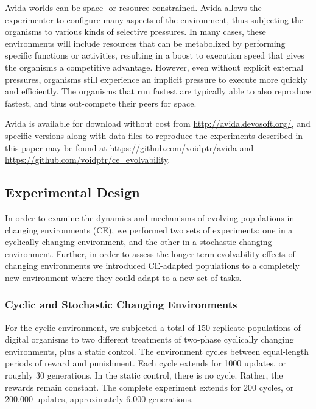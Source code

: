 \documentclass[10pt,letterpaper]{article}
\begin{document}
Avida worlds can be space- or resource-constrained. Avida allows the experimenter to configure many aspects of the environment, thus subjecting the organisms to various kinds of selective pressures.  In many cases, these environments will include resources that can be metabolized by performing specific functions or activities, resulting in a boost to execution speed that gives the organisms a competitive advantage. However, even without explicit external pressures, organisms still experience an implicit pressure to execute more quickly and efficiently. The organisms that run fastest are typically able to also reproduce fastest, and thus out-compete their peers for space.

Avida is available for download without cost from \url{http://avida.devosoft.org/}, and specific versions along with data-files to reproduce the experiments described in this paper may be found at \url{https://github.com/voidptr/avida} and \url{https://github.com/voidptr/ce_evolvability}.

\subsection*{Experimental Design}

In order to examine the dynamics and mechanisms of evolving populations in changing environments (CE), we performed two sets of experiments: one in a cyclically changing environment, and the other in a stochastic changing environment. Further, in order to assess the longer-term evolvability effects of changing environments we introduced CE-adapted populations to a completely new environment where they could adapt to a new set of tasks.

\subsubsection*{Cyclic and Stochastic Changing Environments}
For the cyclic environment,%
we subjected a total of 150 replicate populations of digital organisms to two different treatments of two-phase cyclically changing environments, plus a static control. The environment cycles between equal-length periods of reward and punishment. Each cycle extends for 1000 updates, or roughly 30 generations. In the static control, there is no cycle. Rather, the rewards remain constant. The complete experiment extends for 200 cycles, or 200,000 updates, approximately 6,000 generations.
\end{document}
